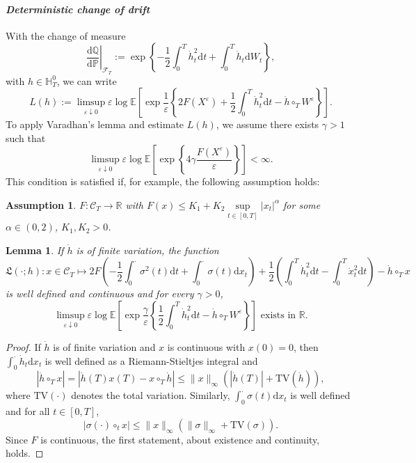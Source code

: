 \documentclass{amsart}[11pt]
\numberwithin{equation}{section}
\numberwithin{theorem}{subsection}
\numberwithin{proposition}{subsection}
\numberwithin{definition}{subsection}
\newtheorem{lemma}{Lemma}
\numberwithin{lemma}{subsection}
\newtheorem{assumption}{Assumption}
\numberwithin{assumption}{subsection}
\newcommand{\Cc}{\mathcal{C}}
\newcommand{\Ff}{\mathcal{F}}
\newcommand{\HH}{\mathbb{H}}
\newcommand{\PP}{\mathbb{P}}
\newcommand{\QQ}{\mathbb{Q}}
\newcommand{\RR}{\mathbb{R}}
\newcommand{\Lf}{\mathfrak{L}}
\newcommand{\EE}{\mathbb{E}}
\newcommand{\ct}{\circ_{t}}
\newcommand{\cT}{\circ_{T}}
\newcommand{\D}{\mathrm{d}}
\newcommand{\eps}{\varepsilon}
\newcommand{\half}{\frac{1}{2}}
\begin{document}
{\paragraph{\textit{Deterministic change of drift}}
With the change of measure
$$
\left. \frac{\D\QQ}{\D\PP}\right|_{\Ff_T}
 := \exp\left\{-\frac{1}{2}\int_0^T\dot{h}_t^2 \D t  + \int_0^T\dot{h}_t\D W_t \right\},
$$
with $h\in\HH_T^0$, we can write
$$
L(h):=\limsup\limits_{\eps\downarrow 0} \eps \log\EE\left[\exp\frac{1}{\eps}\left\{{2F(X^{\eps}) +\frac{1}{2}\int_0^T\dot{h}_t^2 \D t  - \dot{h}\cT W^{\eps}}\right\}\right].
$$
To apply Varadhan's lemma and estimate $L(h)$, we assume there exists $\gamma >1$ such that 
\begin{equation}\label{eq:BSAssume}
\limsup\limits_{\eps\downarrow 0} \eps\log\EE\left[
\exp\left\{4\gamma \frac{F(X^{\eps})}{\eps}\right\}\right] <\infty.
\end{equation}
This condition is satisfied if, for example, the following assumption holds:
\begin{assumption}\label{ass:payoffGuasoni}
$F:\Cc_T\rightarrow\RR$ with $F(x)\leq K_{1} + K_{2} \sup\limits_{t\in[0,T]}|x_t|^{\alpha}$
for some $\alpha\in (0,2)$, $K_{1}, K_{2}>0$.
\end{assumption}
\begin{lemma}\label{lem:BSVaradhanCond}
If $\dot{h}$ is of finite variation, the function
\[
\Lf(\cdot;h):
x\in \Cc_T \mapsto 2F\left(-\frac{1}{2}\int_{0}^{\cdot} \sigma^2(t)\D t + \int_{0}^{\cdot} \sigma(t) \D x_t\right)
 + \half\left(\int_0^T \dot{h}_t^2\D t-\int_0^T \dot{x}_t^2 \D t\right)
 - \dot{h}\cT x
\]
is well defined and continuous and for every $\gamma >0$, 
$$
\limsup\limits_{\eps\downarrow 0} \eps \log\EE\left[\exp\frac{\gamma}{\eps}\left\{\frac{1}{2}\int_0^T \dot{h}_t^2\D t
- \dot{h}\cT W^{\eps}\right\}\right] \text{ exists in }\RR.
$$
\end{lemma}
\begin{proof}
If $\dot{h}$ is of finite variation and $x$ is continuous with $x(0)=0$, 
then $\int_{0}^{\cdot}\dot{h}_t\D x_t$ is well defined as a Riemann-Stieltjes integral and 
$$
\left|\dot{h}\cT x\right| = \left|\dot{h}(T)x(T) - x\cT \dot{h}\right| \leq \|x\|_\infty\left(|\dot{h}(T)| + \mathrm{TV}(\dot{h})\right ),
$$
where $\mathrm{TV}(\cdot)$ denotes the total variation. 
Similarly, $\int_{0}^{\cdot}\sigma(t)\D x_t$ is well defined and for all $t \in [0,T]$,
$$
\left|\sigma(\cdot)\ct x\right| \leq \|x\|_\infty\left(\|\sigma\|_\infty + \mathrm{TV}(\sigma)\right).
$$
Since $F$ is continuous, the first statement, about existence and continuity, holds.

\end{proof}}
\end{document}
